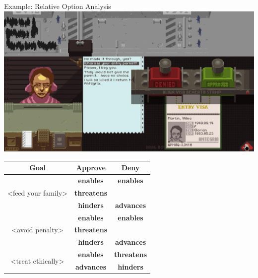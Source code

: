 \documentclass[xcolor=x11names]{beamer}
\begin{document}
\begin{frame}{Example: Relative Option Analysis}
  \centering
  \includegraphics[height=0.3\textheight]{res/papersplease-large.png} \\
  \vspace*{0.5em}
  \footnotesize
  \begin{tabular}{c c c}
    \toprule
    \textbf{Goal} & \textbf{Approve} & \textbf{Deny} \\
    \midrule
    \multirow{3}{*}{<feed your family>} & \textbf{enables} & \textbf{enables} \\
                                        & \textbf{threatens} & \\
                                        & \textbf{hinders} & \textbf{advances} \\
    \midrule

    \multirow{3}{*}{<avoid penalty>} & \textbf{enables} & \textbf{enables} \\
                                     & \textbf{threatens} & \\
                                     & \textbf{hinders} & \textbf{advances} \\
    \midrule

    \multirow{2}{*}{<treat ethically>} & \textbf{enables} & \textbf{threatens} \\
                                       & \textbf{advances} & \textbf{hinders} \\
    \bottomrule
  \end{tabular}
\end{frame}
\end{document}
